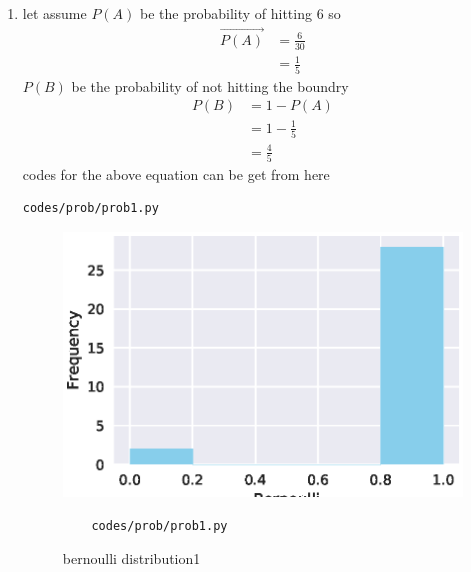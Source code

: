 \renewcommand{\theequation}{\theenumi}
\begin{enumerate}[label=\arabic*.,ref=\thesubsection.\theenumi]
\item let assume $P\left(A\right)$ be the probability of hitting 6 so
\begin{align}
\vec {P\left(A\right)} &= \frac{6}{30}
\\
&= \frac{1}{5}
\end{align}
$P\left(B\right)$ be the probability of not hitting the boundry
\begin{align}
P\left(B\right) &= 1 - P\left(A\right)
\\
&= 1-\frac{1}{5}
\\
&= \frac{4}{5}
\end{align}
codes for the above equation can be get from here
\begin{lstlisting}
codes/prob/prob1.py
\end{lstlisting}
\begin{figure}[!ht]
	\centering
	\includegraphics[width=\columnwidth]{./figures/prob/prob1.eps}
	\caption{bernoulli distribution1 }
	\label{fig:bt1}
	\begin{lstlisting}
	codes/prob/prob1.py
	\end{lstlisting}
\end{figure}
\end{enumerate}